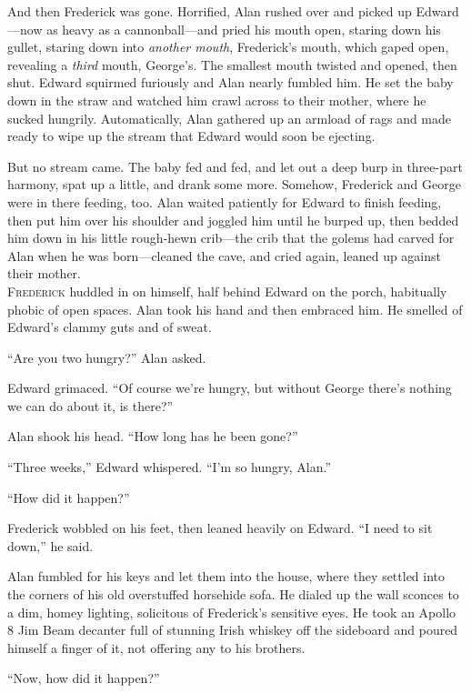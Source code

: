 And then Frederick was gone.  Horrified, Alan rushed over and picked
up Edward---now as heavy as a cannonball---and pried his mouth open,
staring down his gullet, staring down into \textit{another mouth},
Frederick's mouth, which gaped open, revealing a \textit{third} mouth,
George's.  The smallest mouth twisted and opened, then shut.  Edward
squirmed furiously and Alan nearly fumbled him.  He set the baby down
in the straw and watched him crawl across to their mother, where he
sucked hungrily.  Automatically, Alan gathered up an armload of rags
and made ready to wipe up the stream that Edward would soon be
ejecting.

But no stream came.  The baby fed and fed, and let out a deep burp in
three-part harmony, spat up a little, and drank some more.  Somehow,
Frederick and George were in there feeding, too.  Alan waited
patiently for Edward to finish feeding, then put him over his shoulder
and joggled him until he burped up, then bedded him down in his little
rough-hewn crib---the crib that the golems had carved for Alan when he
was born---cleaned the cave, and cried again, leaned up against their
mother.
\\
\lettrine[lines=3, lhang=.5, nindent=0pt, findent=2pt]{F}{rederick} huddled in on himself, half behind Edward on the porch,
habitually phobic of open spaces.  Alan took his hand and then
embraced him.  He smelled of Edward's clammy guts and of sweat.

``Are you two hungry?'' Alan asked.

Edward grimaced.  ``Of course we're hungry, but without George there's
nothing we can do about it, is there?''

Alan shook his head.  ``How long has he been gone?''

``Three weeks,'' Edward whispered.  ``I'm so hungry, Alan.''

``How did it happen?''

Frederick wobbled on his feet, then leaned heavily on Edward.  ``I
need to sit down,'' he said.

Alan fumbled for his keys and let them into the house, where they
settled into the corners of his old overstuffed horsehide sofa.  He
dialed up the wall sconces to a dim, homey lighting, solicitous of
Frederick's sensitive eyes.  He took an Apollo 8 Jim Beam decanter
full of stunning Irish whiskey off the sideboard and poured himself a
finger of it, not offering any to his brothers.

``Now, how did it happen?''

